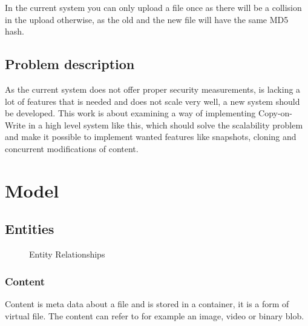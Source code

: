 \documentclass[a4paper,12pt]{article}
\begin{document}
In the current system you can only upload a file once as there will be a collision in the upload otherwise, as the old and 
the new file will have the same MD5 hash.  

\subsection{Problem description}
As the current system does not offer proper security measurements, is lacking a lot of features that is needed and does not 
scale very well, a new system should be developed. This work is about examining a way of implementing Copy-on-Write in a 
high level system like this, which should solve the scalability problem and make it possible to implement wanted features
like snapshots, cloning and concurrent modifications of content.

\newpage 
\section{Model}
\subsection{Entities}
\begin{figure}[htp] 
    \caption{Entity Relationships}
    \label{fig:relation}
\end{figure}

\subsubsection{Content}
Content is meta data about a file and is stored in a container, it is a form of virtual file.
The content can refer to for example an image, video or binary blob.
\end{document}
